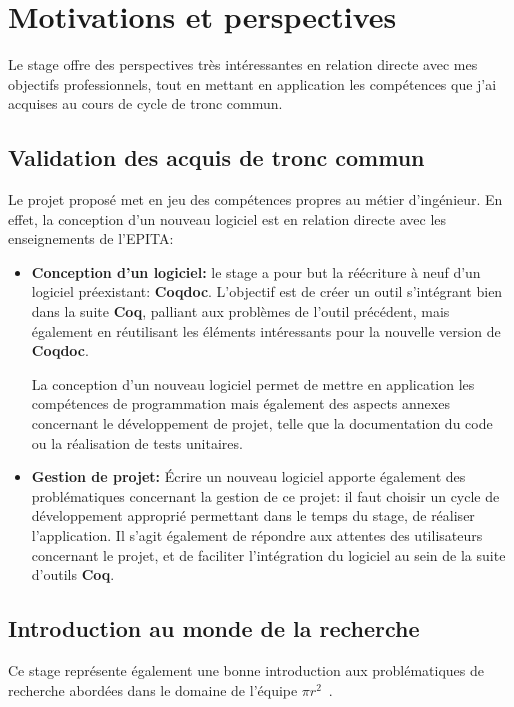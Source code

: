 \documentclass[a4paper, 11pt]{report}
\newcommand{\pir}[0]{\textbf{$\pi r^2$}~}
\newcommand{\coq}[0]{\textbf{Coq}\xspace}
\newcommand{\coqdoc}[0]{\textbf{Coqdoc}\xspace}
\newcommand{\epita}[0]{EPITA}
\begin{document}
  \section{Motivations et perspectives}
  Le stage offre des perspectives très intéressantes en relation directe
  avec mes objectifs professionnels, tout en mettant en application les
  compétences que j'ai acquises au cours de cycle de tronc commun.

  \subsection{Validation des acquis de tronc commun}
  Le projet proposé met en jeu des compétences propres au métier d'ingénieur.
  En effet, la conception d'un nouveau logiciel est en relation directe
  avec les enseignements de l'\epita:
  \begin{itemize}
    \item \textbf{Conception d'un logiciel:} le stage a pour but la réécriture à
      neuf d'un logiciel préexistant: \coqdoc. L'objectif est de créer un outil
      s'intégrant bien dans la suite \coq, palliant aux problèmes de l'outil
      précédent, mais également en réutilisant les éléments intéressants pour
      la nouvelle version de \coqdoc.

      La conception d'un nouveau logiciel permet de mettre en application
      les compétences de programmation mais également des aspects
      annexes concernant le développement de projet, telle que
      la documentation du code ou la réalisation de tests unitaires.
    \item \textbf{Gestion de projet:} Écrire un nouveau logiciel
      apporte également des problématiques concernant la gestion de
      ce projet: il faut choisir un cycle de développement
      approprié permettant dans le temps du stage, de réaliser
      l'application. Il s'agit également de répondre aux attentes
      des utilisateurs concernant le projet, et de faciliter l'intégration
      du logiciel au sein de la suite d'outils \coq.
  \end{itemize}

  \subsection{Introduction au monde de la recherche}
  Ce stage représente également une bonne introduction aux problématiques
  de recherche abordées dans le domaine de l'équipe \pir.
\end{document}
